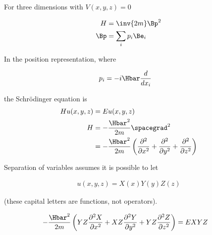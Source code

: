%
%
For three dimensions with $V(x,y,z) = 0$

\begin{equation}\label{eqn:lecture5BigReviewCh4FreeParticle:20}
\begin{aligned}
H &= \inv{2m} \Bp^2 \\
\Bp &= \sum_i p_i \Be_i \\
\end{aligned}
\end{equation}

In the position representation, where

\begin{equation}\label{eqn:lecture5BigReviewCh4FreeParticle:40}
\begin{aligned}
p_i &= -i \Hbar \frac{d}{dx_i}
\end{aligned}
\end{equation}

the Schr\"{o}dinger equation is
\begin{equation}\label{eqn:lecture5BigReviewCh4FreeParticle:60}
\begin{aligned}
H u(x,y,z) &= E u(x,y,z) \\
H &= -\frac{\Hbar^2}{2m} \spacegrad^2 \\
&= -\frac{\Hbar^2}{2m} \left(
\frac{\partial^2}{\partial {x}^2}
+\frac{\partial^2}{\partial {y}^2}
+\frac{\partial^2}{\partial {z}^2}
\right)
\end{aligned}
\end{equation}

Separation of variables assumes it is possible to let

\begin{equation}\label{eqn:lecture5BigReviewCh4FreeParticle:80}
\begin{aligned}
u(x,y,z) = X(x) Y(y) Z(z)
\end{aligned}
\end{equation}

(these capital letters are functions, not operators).

\begin{equation}\label{eqn:lecture5BigReviewCh4FreeParticle:100}
\begin{aligned}
-\frac{\Hbar^2}{2m} \left(
YZ \frac{\partial^2 X}{\partial {x}^2}
+ XZ \frac{\partial^2 Y}{\partial {y}^2}
+ YZ \frac{\partial^2 Z}{\partial {z}^2}\right)
&= E X Y Z
\end{aligned}
\end{equation}

